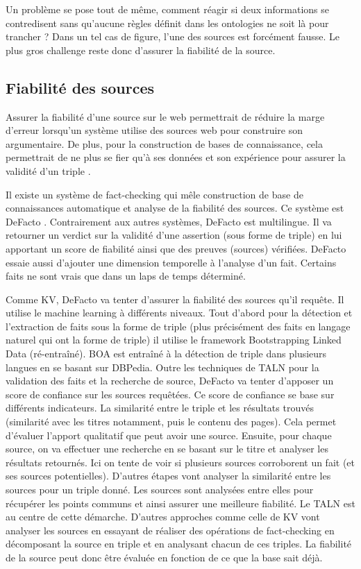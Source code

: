 Un problème se pose tout de même, comment réagir si deux informations se contredisent sans qu'aucune règles définit dans les ontologies ne soit là pour trancher ? Dans un tel cas de figure, l'une des sources est forcément fausse. Le plus gros challenge reste donc d'assurer la fiabilité de la source.

\subsection{Fiabilité des sources}

Assurer la fiabilité d'une source sur le web permettrait de réduire la marge d'erreur lorsqu'un système utilise des sources web pour construire son argumentaire. De plus, pour la construction de bases de connaissance, cela permettrait de ne plus se fier qu'à ses données et son expérience pour assurer la validité d'un triple \cite{dong2015knowledge}.

Il existe un système de fact-checking qui mêle construction de base de connaissances automatique et analyse de la fiabilité des sources. Ce système est DeFacto \cite{gerber2015}. Contrairement aux autres systèmes, DeFacto est multilingue. Il va retourner un verdict sur la validité d'une assertion (sous forme de triple) en lui apportant un score de fiabilité ainsi que des preuves (sources) vérifiées. DeFacto essaie aussi d'ajouter une dimension temporelle à l'analyse d'un fait. Certains faits ne sont vrais que dans un laps de temps déterminé.

Comme KV, DeFacto va tenter d'assurer la fiabilité des sources qu'il requête. Il utilise le machine learning à différents niveaux. Tout d'abord pour la détection et l'extraction de faits sous la forme de triple (plus précisément des faits en langage naturel qui ont la forme de triple) il utilise le framework Bootstrapping Linked Data (ré-entraîné). BOA est entraîné à la détection de triple dans plusieurs langues en se basant sur DBPedia. Outre les techniques de TALN pour la validation des faits et la recherche de source, DeFacto va tenter d'apposer un score de confiance sur les sources requêtées. Ce score de confiance se base sur différents indicateurs. La similarité entre le triple et les résultats trouvés (similarité avec les titres notamment, puis le contenu des pages). Cela permet d'évaluer l'apport qualitatif que peut avoir une source. Ensuite, pour chaque source, on va effectuer une recherche en se basant sur le titre et analyser les résultats retournés. Ici on tente de voir si plusieurs sources corroborent un fait (et ses sources potentielles). D'autres étapes vont analyser la similarité entre les sources pour un triple donné. Les sources sont analysées entre elles pour récupérer les points communs et ainsi assurer une meilleure fiabilité. Le TALN est au centre de cette démarche. D'autres approches comme celle de KV vont analyser les sources en essayant de réaliser des opérations de fact-checking en décomposant la source en triple et en analysant chacun de ces triples. La fiabilité de la source peut donc être évaluée en fonction de ce que la base sait déjà.

